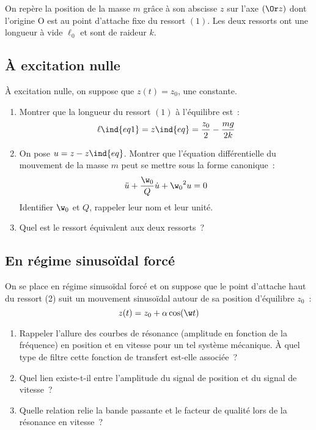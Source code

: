 \documentclass[a4paper, 11pt, final, garamond]{book}
\begin{document}
On repère la position de la masse $m$ grâce à son abscisse $z$ sur l'axe $(\Or
z)$ dont l'origine O est au point d'attache fixe du ressort $(1)$. Les deux
ressorts ont une longueur à vide $\ell_0$ et sont de raideur $k$.

\subsection{À excitation nulle}

À excitation nulle, on suppose que $z(t) = z_0$, une constante. 

\begin{enumerate}[label=\clenumi]
    \item Montrer que la longueur du ressort $(1)$ à l'équilibre est~: 
        \[
            \ell\ind{eq1} = z\ind{eq} = \frac{z_0}{2} - \frac{mg}{2k}
        \]
    \item On pose $u = z-z\ind{eq}$. Montrer que l'équation différentielle du
        mouvement de la masse $m$ peut se mettre sous la forme canonique~: 
        \[
            \ddot{u} + \frac{\w_0}{Q} \dot{u} + {\w_0}^2 u = 0
        \]
        Identifier $\w_0$ et $Q$, rappeler leur nom et leur unité.
    \item Quel est le ressort équivalent aux deux ressorts~?
\end{enumerate}

\subsection{En régime sinusoïdal forcé}

On se place en régime sinusoïdal forcé et on suppose que le point d'attache haut
du ressort (2) suit un mouvement sinusoïdal autour de sa position d'équilibre
$z_0$~: 
\[
    z(t) = z_0 + \alpha \cos(\w t)
\]

\begin{enumerate}[label=\clenumi, resume]
    \item Rappeler l'allure des courbes de résonance (amplitude en fonction de
        la fréquence) en position et en vitesse pour un tel système mécanique. À
        quel type de filtre cette fonction de transfert est-elle associée~?
    \item Quel lien existe-t-il entre l'amplitude du signal de position et du
        signal de vitesse~? 
    \item Quelle relation relie la bande passante et le facteur de qualité lors
        de la résonance en vitesse~?
\end{enumerate}
\end{document}
